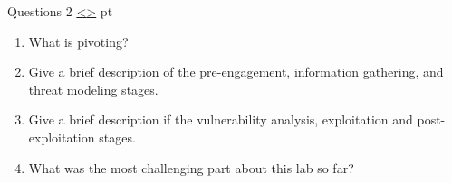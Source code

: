 \documentclass[12pt]{extarticle}
\newenvironment{instructionblock}{\Large\bgroup}{\egroup}
\newcounter{next}
\newcounter{prev}
\begin{document}
\pagebreak
{}
\begin{slide}{Questions 2}
{\hyperref[slide \theprev]{\textless}\hyperref[slide \thenext]{\textgreater}}
	 pt
	\begin{instructionblock}
		\begin{enumerate}
            \item What is pivoting?
            \item Give a brief description of the pre-engagement, information gathering, and threat modeling stages.
            \item Give a brief description if the vulnerability analysis, exploitation and post-exploitation stages.
            \item What was the most challenging part about this lab so far?
		\end{enumerate}
	\end{instructionblock}
\end{slide}
\end{document}

